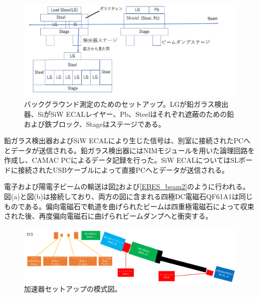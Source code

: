 \begin{figure}[H]
	\begin{center}
		\includegraphics[width=330pt]{./Figure/EBES/EBES_det.pdf}
		\caption[バックグラウンド測定のためのセットアップ]{バックグラウンド測定のためのセットアップ。LGが鉛ガラス検出器、SiがSiW ECALレイヤー、Pb、Steelはそれぞれ遮蔽のための鉛および鉄ブロック、Stageはステージである。}
		\label{EBES_det}
	\end{center}
\end{figure}


鉛ガラス検出器およびSiW ECALにより生じた信号は、別室に接続されたPCへとデータが送信される。鉛ガラス検出器にはNIMモジュールを用いた論理回路を作成し、CAMAC PCによるデータ記録を行った。SiW ECALについてはSLボードに接続されたUSBケーブルによって直接PCへとデータが送信される。

電子および陽電子ビームの輸送は図\ref{EBES_beam1}および\ref{EBES_beam2}のように行われる。図(a)と図(b)は接続しており、両方の図に含まれる四極DC電磁石QF61A1は同じものである。偏向電磁石で軌道を曲げられたビームは四重極電磁石によって収束された後、再度偏向電磁石に曲げられビームダンプへと衝突する。

\begin{figure}[H]
 		 	\includegraphics[width=400pt]{./Figure/EBES/EBES_beam1.png}%
	\caption[加速器セットアップの模式図]{加速器セットアップの模式図。}
	\label{EBES_beam1}
\end{figure}


